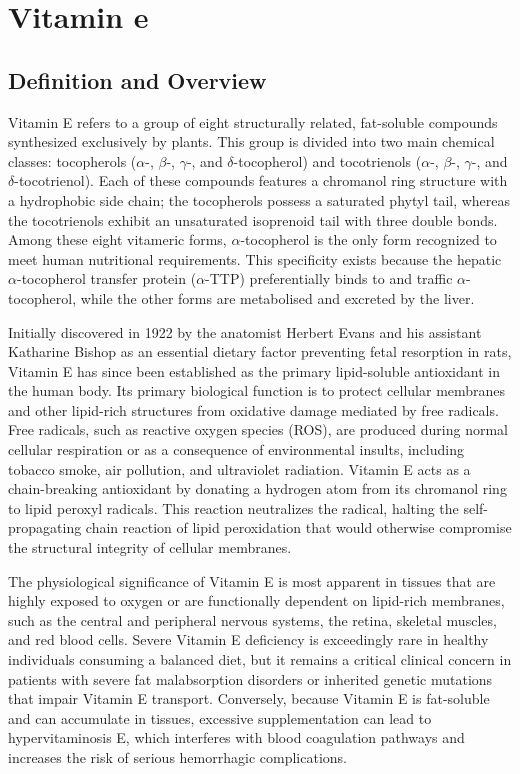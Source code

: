 \chapter{Vitamin e}

\section*{Definition and Overview}
Vitamin E refers to a group of eight structurally related, fat-soluble compounds synthesized exclusively by plants. This group is divided into two main chemical classes: tocopherols ($\alpha$-, $\beta$-, $\gamma$-, and $\delta$-tocopherol) and tocotrienols ($\alpha$-, $\beta$-, $\gamma$-, and $\delta$-tocotrienol). Each of these compounds features a chromanol ring structure with a hydrophobic side chain; the tocopherols possess a saturated phytyl tail, whereas the tocotrienols exhibit an unsaturated isoprenoid tail with three double bonds. Among these eight vitameric forms, $\alpha$-tocopherol is the only form recognized to meet human nutritional requirements. This specificity exists because the hepatic $\alpha$-tocopherol transfer protein ($\alpha$-TTP) preferentially binds to and traffic $\alpha$-tocopherol, while the other forms are metabolised and excreted by the liver.

Initially discovered in 1922 by the anatomist Herbert Evans and his assistant Katharine Bishop as an essential dietary factor preventing fetal resorption in rats, Vitamin E has since been established as the primary lipid-soluble antioxidant in the human body. Its primary biological function is to protect cellular membranes and other lipid-rich structures from oxidative damage mediated by free radicals. Free radicals, such as reactive oxygen species (ROS), are produced during normal cellular respiration or as a consequence of environmental insults, including tobacco smoke, air pollution, and ultraviolet radiation. Vitamin E acts as a chain-breaking antioxidant by donating a hydrogen atom from its chromanol ring to lipid peroxyl radicals. This reaction neutralizes the radical, halting the self-propagating chain reaction of lipid peroxidation that would otherwise compromise the structural integrity of cellular membranes.

The physiological significance of Vitamin E is most apparent in tissues that are highly exposed to oxygen or are functionally dependent on lipid-rich membranes, such as the central and peripheral nervous systems, the retina, skeletal muscles, and red blood cells. Severe Vitamin E deficiency is exceedingly rare in healthy individuals consuming a balanced diet, but it remains a critical clinical concern in patients with severe fat malabsorption disorders or inherited genetic mutations that impair Vitamin E transport. Conversely, because Vitamin E is fat-soluble and can accumulate in tissues, excessive supplementation can lead to hypervitaminosis E, which interferes with blood coagulation pathways and increases the risk of serious hemorrhagic complications.

